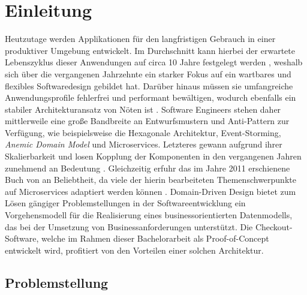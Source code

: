 

\chapter{Einleitung}

Heutzutage werden Applikationen für den langfristigen Gebrauch in einer produktiver Umgebung entwickelt. Im Durchschnitt kann hierbei der erwartete Lebenszyklus dieser Anwendungen auf circa 10 Jahre festgelegt werden \cite{Tamai.1992}, weshalb sich über die vergangenen Jahrzehnte ein starker Fokus auf ein wartbares und flexibles Softwaredesign gebildet hat. Darüber hinaus müssen sie umfangreiche Anwendungsprofile fehlerfrei und performant bewältigen, wodurch ebenfalls ein stabiler Architekturansatz von Nöten ist \cite{Bosch.2001}. Software Engineers stehen daher mittlerweile eine große Bandbreite an Entwurfsmustern und Anti-Pattern zur Verfügung, wie beispielsweise die Hexagonale Architektur, Event-Storming, \emph{\Gls{Anemic Domain Model}} und Microservices. Letzteres gewann aufgrund ihrer Skalierbarkeit und losen Kopplung der Komponenten in den vergangenen Jahren zunehmend an Bedeutung \cite{oreilly.Microservices, Sampaio.2017}. Gleichzeitig erfuhr das im Jahre 2011 erschienene Buch  von \citeauthor{Evans.2011} an Beliebtheit, da viele der hierin bearbeiteten Themenschwerpunkte auf Microservices adaptiert werden können \cite[S. 130ff.]{Vernon.2015}\cite{Microservice.DDD.2017}. Domain-Driven Design bietet zum Lösen gängiger Problemstellungen in der Softwareentwicklung ein Vorgehensmodell für die Realisierung eines businessorientierten Datenmodells, das bei der Umsetzung von Businessanforderungen unterstützt. Die Checkout-Software, welche im Rahmen dieser Bachelorarbeit als Proof-of-Concept entwickelt wird, profitiert von den Vorteilen einer solchen Architektur.

\section{Problemstellung}

